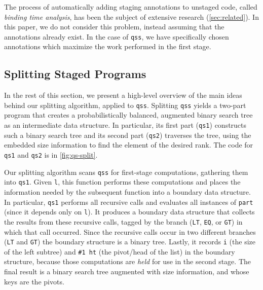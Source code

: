 \begin{abstrsyn}
The process of automatically adding staging annotations to unstaged code,
called \emph{binding time analysis}, has been
the subject of extensive research (\ref{sec:related}). In this paper, we do not
consider this problem, instead assuming that the annotations already exist.
In the case of \texttt{qss}, we have specifically chosen annotations which
maximize the work performed in the first stage.

\subsection{Splitting Staged Programs}



In the rest of this section, we present a high-level overview of the main ideas
behind our splitting algorithm, applied to \texttt{qss}.
%
Splitting \texttt{qss} yields a two-part program that creates a
probabilistically balanced, augmented binary search tree 
as an intermediate data structure. In
particular, its first part (\texttt{qs1}) constructs such a binary search tree
and its second part (\texttt{qs2}) traverses the tree, using the embedded size
information to find the element of the desired rank.
%
The code for \texttt{qs1} and \texttt{qs2} is in \ref{fig:qs-split}.


Our splitting algorithm scans \texttt{qss} for first-stage computations,
gathering them into \texttt{qs1}. Given \texttt{l}, this function performs these
computations and places the information needed by the subsequent function into a
boundary data structure.
%
In particular, \texttt{qs1} performs all recursive calls and evaluates all
instances of \texttt{part} (since it depends only on \texttt{l}). It
produces a boundary data structure that collects the results from these
recursive calls, tagged by the branch (\texttt{LT}, \texttt{EQ}, or \texttt{GT})
in which that call occurred. Since the recursive calls occur in two different
branches (\texttt{LT} and \texttt{GT}) the boundary structure is a binary tree.  
%
Lastly, it records \texttt{i} (the size of the left subtree) and \texttt{\#1 ht}
(the pivot/head of the list) in the boundary structure, because those
computations are \emph{held} for use in the second stage.
%
The final result is a binary search tree augmented with size information, and
whose keys are the pivots.


\end{abstrsyn}
